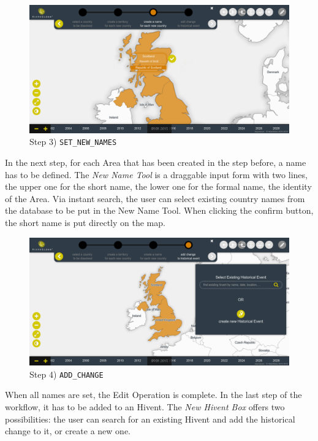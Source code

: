 \vspace{1em}
\begin{minipage}[t]{0.47\textwidth}

  \begin{figure}[H]
    \centering
    \includegraphics[width=1.0\textwidth]{graphics/development/final_interface/5_set_new_name.png}
    \caption{Step 3) \texttt{SET\_NEW\_NAMES}}
    \label{fig:final_5_set_new_name}
  \end{figure}

  In the next step, for each Area that has been created in the step before, a name has to be defined. The \emph{New Name Tool} is a draggable input form with two lines, the upper one for the short name, the lower one for the formal name, the identity of the Area. Via instant search, the user can select existing country names from the database to be put in the New Name Tool. When clicking the confirm button, the short name is put directly on the map.

\end{minipage}    %
\hspace{1.5em}    %
\begin{minipage}[t]{0.47\textwidth}

  \begin{figure}[H]
    \centering
    \includegraphics[width=1.0\textwidth]{graphics/development/final_interface/6_add_change_to_hivent_1.png}
    \caption{Step 4) \texttt{ADD\_CHANGE}}
    \label{fig:final_6_add_change_to_hivent_1}
  \end{figure}

  When all names are set, the Edit Operation is complete. In the last step of the workflow, it has to be added to an Hivent. The \emph{New Hivent Box} offers two possibilities: the user can search for an existing Hivent and add the historical change to it, or create a new one.

\end{minipage}
